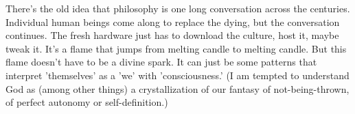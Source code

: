 \documentclass{article}
\begin{document}
There's the old idea that philosophy is one long conversation across the centuries. Individual human beings come along to replace the dying, but the conversation continues. The fresh hardware just has to download the culture, host it, maybe tweak it. It's a flame that jumps from melting candle to melting candle. But this flame doesn't have to be a divine spark. It can just be some patterns that interpret 'themselves' as a 'we' with 'consciousness.' (I am tempted to understand God as (among other things) a crystallization of our fantasy of not-being-thrown, of perfect autonomy or self-definition.)
\end{document}
